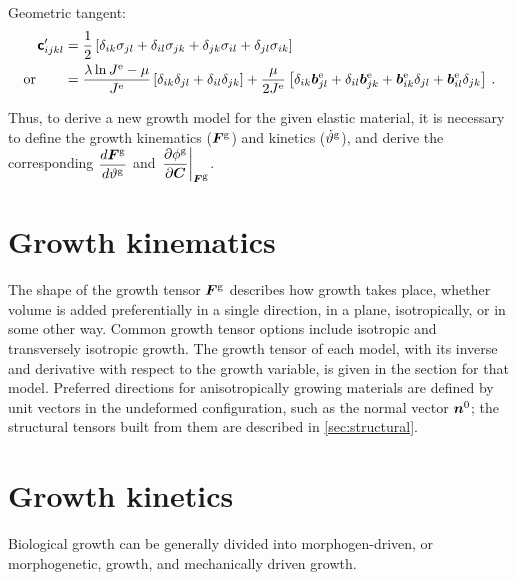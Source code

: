 \documentclass[10pt,letterpaper,oneside]{report}
\newcommand{\ten}[1]{\mbox{\boldmath $#1$}{}}
\newcommand{\tenf}[1]{\mbox{{\sffamily{\bfseries {#1}}}}}
\newcommand{\scas}[1]{\mbox{{\scriptsize{${\rm{#1}}$}}}{}}
\newcommand{\tens}[1]{\mbox{\boldmath{\scriptsize{$#1$}}}{}}
\begin{document}
Geometric tangent:
\begin{align}
\tenf{c}'_{ijkl} ={}& \frac{1}{2} \left[ \delta_{ik}\sigma_{jl} + \delta_{il}\sigma_{jk} + \delta_{jk}\sigma_{il} + \delta_{jl}\sigma_{ik} \right]  
\\ \text{or} \qquad
={}& \frac{\lambda \ln J^{\scas{e}} - \mu}{J^{\scas{e}}} \left[ \delta_{ik} \delta_{jl} + \delta_{il} \delta_{jk} \right] + \frac{\mu}{2J^{\scas{e}}} \left[ \delta_{ik} \ten{b}^{\scas{e}}_{jl} + \delta_{il} \ten{b}^{\scas{e}}_{jk} + \ten{b}^{\scas{e}}_{ik} \delta_{jl} + \ten{b}^{\scas{e}}_{il} \delta_{jk} \right] \, .
\end{align}

Thus, to derive a new growth model for the given elastic material, it is necessary to define the growth kinematics ($\ten{F}^{\scas{g}}$) and kinetics ($\dot{\vartheta}^{\scas{g}}$), and derive the corresponding $\dfrac{ d \ten{F}^{\scas{g}} }{ d \vartheta^{\scas{g}} }$ and $\left. \dfrac{ \partial \phi^{\scas{g}} }{ \partial \ten{C} } \right|_{\tens{F}^{\scas{g}}}$.

\section{Growth kinematics}
\label{kinematics}
The shape of the growth tensor $\ten{F}^{\scas{g}}$ describes how growth takes place, whether volume is added preferentially in a single direction, in a plane, isotropically, or in some other way. Common growth tensor options include isotropic and transversely isotropic growth.  
The growth tensor of each model, with its inverse and derivative with respect to the growth variable, is given in the section for that model.
Preferred directions for anisotropically growing materials are defined by unit vectors in the undeformed configuration, such as the normal vector $\ten{n}^0$; the structural tensors built from them are described in \autoref{sec:structural}.


\section{Growth kinetics}
\label{kinetics}
Biological growth can be generally divided into morphogen-driven, or morphogenetic, growth, and mechanically driven growth.  
\end{document}
